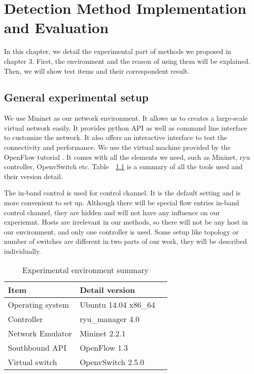 \chapter{Detection Method Implementation and Evaluation}
In this chapter, we detail the experimental part of methods we proposed in chapter 3. First, the environment and the reason of using them will be explained. Then, we will show test items and their correspondent result.

\section{General experimental setup}
We use Mininet as our network environment. It allows us to creates a large-scale virtual network easily. 
It provides python API as well as command line interface to customize the network. It also offers an interactive interface to test the connectivity and performance. We use the virtual machine provided by the OpenFlow tutorial \cite{OFT}. It comes with all the elements we need, such as Mininet, ryu controller, OpenvSwitch etc. Table~~\ref{table:Experiment_table} is a summary of all the tools used and their version detail. 

The in-band control is used for control channel. It is the default setting and is more convenient to set up. Although there will be special flow entries in-band control channel, they are hidden and will not have any influence on our experiemnt. Hosts are irrelevant in our methods, so there will not be any host in our environment, and only one controller is used. Some setup like topology or number of switches are different in two parts of our work, they will be described individually.

\begin{table}[H]
\centering
\caption{Experimental environment summary}
\begin{tabular}{|l|p{4cm}|p{4.5cm}}
\hline Item & Detail version \\
\hline Operating system & Ubuntu 14.04 x86\_64 \\
\hline Controller & ryu\_manager 4.0 \\
\hline Network Emulator & Mininet 2.2.1 \\
\hline Southbound API & OpenFlow 1.3 \\
\hline Virtual switch & OpenvSwitch 2.5.0 \\
\hline 
\end{tabular}
\label{table:Experiment_table}
\end{table}

